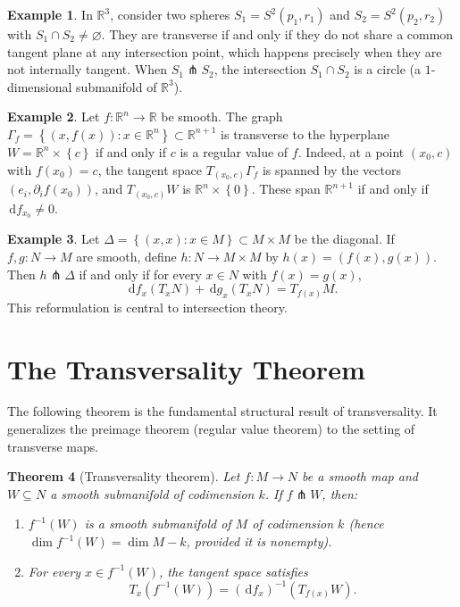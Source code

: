 \documentclass[12pt,a4paper,openany]{book}
\newtheorem{theorem}{Theorem}[section]
\theoremstyle{definition}
\newtheorem{example}[theorem]{Example}
\theoremstyle{remark}
\newcommand{\R}{\mathbb{R}}
\newcommand{\dd}{\,\mathrm{d}}
\newcommand{\set}[1]{\left\{ #1 \right\}}
\begin{document}
\begin{example}\label{ex:transverse-spheres}
In $\R^3$, consider two spheres $S_1 = S^2(p_1, r_1)$ and
$S_2 = S^2(p_2, r_2)$ with $S_1 \cap S_2 \neq \varnothing$. They
are transverse if and only if they do not share a common tangent plane
at any intersection point, which happens precisely when they are not
internally tangent. When $S_1 \pitchfork S_2$, the intersection
$S_1 \cap S_2$ is a circle (a $1$-dimensional submanifold of $\R^3$).
\end{example}

\begin{example}\label{ex:transverse-graph}
Let $f \colon \R^n \to \R$ be smooth. The graph
$\Gamma_f = \set{(x, f(x)) : x \in \R^n} \subset \R^{n+1}$ is
transverse to the hyperplane $W = \R^n \times \set{c}$ if and only
if $c$ is a regular value of $f$. Indeed, at a point $(x_0, c)$
with $f(x_0) = c$, the tangent space $T_{(x_0,c)}\Gamma_f$ is spanned
by the vectors $(e_i, \partial_i f(x_0))$, and $T_{(x_0,c)}W$ is
$\R^n \times \set{0}$. These span $\R^{n+1}$ if and only if
$\dd f_{x_0} \neq 0$.
\end{example}

\begin{example}\label{ex:transverse-diagonal}
Let $\Delta = \set{(x,x) : x \in M} \subset M \times M$ be the diagonal.
If $f, g \colon N \to M$ are smooth, define
$h \colon N \to M \times M$ by $h(x) = (f(x), g(x))$.
Then $h \pitchfork \Delta$ if and only if for every $x \in N$ with
$f(x) = g(x)$,
\[
  \dd f_x(T_x N) + \dd g_x(T_x N) = T_{f(x)} M.
\]
This reformulation is central to intersection theory.
\end{example}

\section{The Transversality Theorem}\label{sec:transversality-theorem}

The following theorem is the fundamental structural result of transversality.
It generalizes the preimage theorem (regular value theorem) to the setting
of transverse maps.

\begin{theorem}[Transversality theorem]\label{thm:transversality}
Let $f \colon M \to N$ be a smooth map and $W \subseteq N$ a smooth
submanifold of codimension $k$. If $f \pitchfork W$, then:
\begin{enumerate}[label=(\roman*)]
  \item $f^{-1}(W)$ is a smooth submanifold of $M$ of codimension $k$
    (hence $\dim f^{-1}(W) = \dim M - k$, provided it is nonempty).
  \item For every $x \in f^{-1}(W)$, the tangent space satisfies
    \[
      T_x(f^{-1}(W)) = (\dd f_x)^{-1}(T_{f(x)} W).
    \]
\end{enumerate}
\end{theorem}
\end{document}
